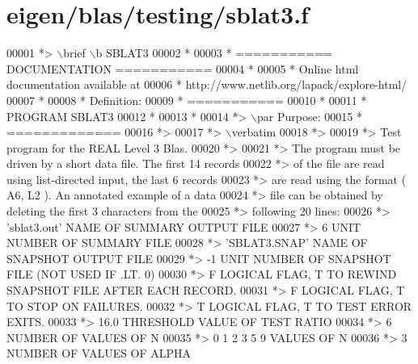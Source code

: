\hypertarget{eigen_2blas_2testing_2sblat3_8f_source}{}\section{eigen/blas/testing/sblat3.f}
\label{eigen_2blas_2testing_2sblat3_8f_source}

\begin{DoxyCode}
00001 \textcolor{comment}{*> \(\backslash\)brief \(\backslash\)b SBLAT3}
00002 \textcolor{comment}{*}
00003 \textcolor{comment}{*  =========== DOCUMENTATION ===========}
00004 \textcolor{comment}{*}
00005 \textcolor{comment}{* Online html documentation available at }
00006 \textcolor{comment}{*            http://www.netlib.org/lapack/explore-html/ }
00007 \textcolor{comment}{*}
00008 \textcolor{comment}{*  Definition:}
00009 \textcolor{comment}{*  ===========}
00010 \textcolor{comment}{*}
00011 \textcolor{comment}{*       PROGRAM SBLAT3}
00012 \textcolor{comment}{* }
00013 \textcolor{comment}{*}
00014 \textcolor{comment}{*> \(\backslash\)par Purpose:}
00015 \textcolor{comment}{*  =============}
00016 \textcolor{comment}{*>}
00017 \textcolor{comment}{*> \(\backslash\)verbatim}
00018 \textcolor{comment}{*>}
00019 \textcolor{comment}{*> Test program for the REAL             Level 3 Blas.}
00020 \textcolor{comment}{*>}
00021 \textcolor{comment}{*> The program must be driven by a short data file. The first 14 records}
00022 \textcolor{comment}{*> of the file are read using list-directed input, the last 6 records}
00023 \textcolor{comment}{*> are read using the format ( A6, L2 ). An annotated example of a data}
00024 \textcolor{comment}{*> file can be obtained by deleting the first 3 characters from the}
00025 \textcolor{comment}{*> following 20 lines:}
00026 \textcolor{comment}{*> 'sblat3.out'      NAME OF SUMMARY OUTPUT FILE}
00027 \textcolor{comment}{*> 6                 UNIT NUMBER OF SUMMARY FILE}
00028 \textcolor{comment}{*> 'SBLAT3.SNAP'     NAME OF SNAPSHOT OUTPUT FILE}
00029 \textcolor{comment}{*> -1                UNIT NUMBER OF SNAPSHOT FILE (NOT USED IF .LT. 0)}
00030 \textcolor{comment}{*> F        LOGICAL FLAG, T TO REWIND SNAPSHOT FILE AFTER EACH RECORD.}
00031 \textcolor{comment}{*> F        LOGICAL FLAG, T TO STOP ON FAILURES.}
00032 \textcolor{comment}{*> T        LOGICAL FLAG, T TO TEST ERROR EXITS.}
00033 \textcolor{comment}{*> 16.0     THRESHOLD VALUE OF TEST RATIO}
00034 \textcolor{comment}{*> 6                 NUMBER OF VALUES OF N}
00035 \textcolor{comment}{*> 0 1 2 3 5 9       VALUES OF N}
00036 \textcolor{comment}{*> 3                 NUMBER OF VALUES OF ALPHA}

\end{DoxyCode}

